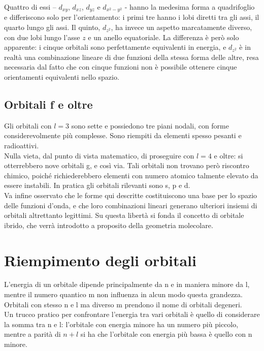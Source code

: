 Quattro di essi -- $d_{xy}$, $d_{xz}$, $d_{yz}$ e $d_{x^2-y^2}$ - hanno la medesima forma a quadrifoglio e differiscono solo per l'orientamento: i primi tre hanno i lobi diretti tra gli assi, il quarto lungo gli assi. 
Il quinto, $d_{z^2}$, ha invece un aspetto marcatamente diverso, con due lobi lungo l'asse $z$ e un anello equatoriale. 
La differenza è però solo apparente: i cinque orbitali sono perfettamente equivalenti in energia, e $d_{z^2}$ è in realtà una combinazione lineare di due funzioni della stessa forma delle altre, resa necessaria dal fatto che con cinque funzioni non è possibile ottenere cinque orientamenti equivalenti nello spazio.\\

\subsection{Orbitali f e oltre}

Gli orbitali con $l = 3$ sono sette e possiedono tre piani nodali, con forme considerevolmente più complesse. Sono riempiti da elementi spesso pesanti e radioattivi.\\

Nulla vieta, dal punto di vista matematico, di proseguire con $l = 4$ e oltre: si otterrebbero nove orbitali g, e così via. Tali orbitali non trovano però riscontro chimico, poiché richiederebbero elementi con numero atomico talmente elevato da essere instabili. In pratica gli orbitali rilevanti sono s, p e d.\\

Va infine osservato che le forme qui descritte costituiscono una base per lo spazio delle funzioni d'onda, e che loro combinazioni lineari generano ulteriori insiemi di orbitali altrettanto legittimi. Su questa libertà si fonda il concetto di orbitale ibrido, che verrà introdotto a proposito della geometria molecolare.

\section{Riempimento degli orbitali}

L'energia di un orbitale dipende principalmente da n e in maniera minore da l, mentre il numero quantico m non influenza in alcun modo questa grandezza. Orbitali con stesso n e l ma diverso m prendono il nome di orbitali degeneri.\\

Un trucco pratico per confrontare l'energia tra vari orbitali è quello di considerare la somma tra n e l: l'orbitale con energia minore ha un numero più piccolo, mentre a parità di $n + l$ si ha che l'orbitale con energia più bassa è quello con n minore.\\

